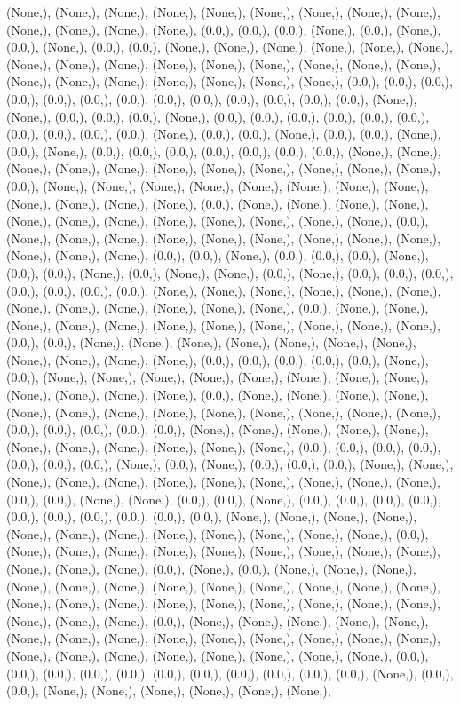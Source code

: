 \documentclass{article}
\begin{document}
(None,), (None,), (None,), (None,), (None,), (None,), (None,), (None,), (None,), (None,), (None,), (None,), (None,), (0.0,), (0.0,), (0.0,), (None,), (0.0,), (None,), (0.0,), (None,), (0.0,), (0.0,), (None,), (None,), (None,), (None,), (None,), (None,), (None,), (None,), (None,), (None,), (None,), (None,), (None,), (None,), (None,), (None,), (None,), (None,), (None,), (None,), (None,), (None,), (0.0,), (0.0,), (0.0,), (0.0,), (0.0,), (0.0,), (0.0,), (0.0,), (0.0,), (0.0,), (0.0,), (0.0,), (0.0,), (None,), (None,), (0.0,), (0.0,), (0.0,), (None,), (0.0,), (0.0,), (0.0,), (0.0,), (0.0,), (0.0,), (0.0,), (0.0,), (0.0,), (0.0,), (None,), (0.0,), (0.0,), (None,), (0.0,), (0.0,), (None,), (0.0,), (None,), (0.0,), (0.0,), (0.0,), (0.0,), (0.0,), (0.0,), (0.0,), (None,), (None,), (None,), (None,), (None,), (None,), (None,), (None,), (None,), (None,), (None,), (0.0,), (None,), (None,), (None,), (None,), (None,), (None,), (None,), (None,), (None,), (None,), (None,), (None,), (0.0,), (None,), (None,), (None,), (None,), (None,), (None,), (None,), (None,), (None,), (None,), (None,), (None,), (0.0,), (None,), (None,), (None,), (None,), (None,), (None,), (None,), (None,), (None,), (None,), (None,), (None,), (0.0,), (0.0,), (None,), (0.0,), (0.0,), (0.0,), (None,), (0.0,), (0.0,), (None,), (0.0,), (None,), (None,), (0.0,), (None,), (0.0,), (0.0,), (0.0,), (0.0,), (0.0,), (0.0,), (0.0,), (None,), (None,), (None,), (None,), (None,), (None,), (None,), (None,), (None,), (None,), (None,), (None,), (0.0,), (None,), (None,), (None,), (None,), (None,), (None,), (None,), (None,), (None,), (None,), (None,), (0.0,), (0.0,), (None,), (None,), (None,), (None,), (None,), (None,), (None,), (None,), (None,), (None,), (None,), (0.0,), (0.0,), (0.0,), (0.0,), (0.0,), (None,), (0.0,), (None,), (None,), (None,), (None,), (None,), (None,), (None,), (None,), (None,), (None,), (None,), (None,), (0.0,), (None,), (None,), (None,), (None,), (None,), (None,), (None,), (None,), (None,), (None,), (None,), (None,), (None,), (0.0,), (0.0,), (0.0,), (0.0,), (0.0,), (None,), (None,), (None,), (None,), (None,), (None,), (None,), (None,), (None,), (None,), (None,), (0.0,), (0.0,), (0.0,), (0.0,), (0.0,), (0.0,), (0.0,), (None,), (0.0,), (None,), (0.0,), (0.0,), (0.0,), (None,), (None,), (None,), (None,), (None,), (None,), (None,), (None,), (None,), (None,), (None,), (0.0,), (0.0,), (None,), (None,), (0.0,), (0.0,), (None,), (0.0,), (0.0,), (0.0,), (0.0,), (0.0,), (0.0,), (0.0,), (0.0,), (0.0,), (0.0,), (None,), (None,), (None,), (None,), (None,), (None,), (None,), (None,), (None,), (None,), (None,), (None,), (0.0,), (None,), (None,), (None,), (None,), (None,), (None,), (None,), (None,), (None,), (None,), (None,), (None,), (0.0,), (None,), (0.0,), (None,), (None,), (None,), (None,), (None,), (None,), (None,), (None,), (None,), (None,), (None,), (None,), (None,), (None,), (None,), (None,), (None,), (None,), (None,), (None,), (None,), (None,), (None,), (None,), (0.0,), (None,), (None,), (None,), (None,), (None,), (None,), (None,), (None,), (None,), (None,), (None,), (None,), (None,), (None,), (None,), (None,), (None,), (None,), (None,), (None,), (None,), (None,), (0.0,), (0.0,), (0.0,), (0.0,), (0.0,), (0.0,), (0.0,), (0.0,), (0.0,), (0.0,), (0.0,), (None,), (0.0,), (0.0,), (None,), (None,), (None,), (None,), (None,), (None,), 
\end{document}
